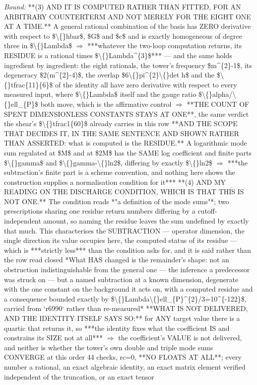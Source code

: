 \begin{description}
 \emph{Bound:}  **(3) AND IT IS COMPUTED RATHER THAN FITTED, FOR AN ARBITRARY COUNTERTERM AND NOT MERELY FOR THE EIGHT ONE AT A TIME.** A general rational combination of the basis has ZERO derivative with respect to \$\textbackslash\{\}hbar\$, \$G\$ and \$c\$ and is exactly homogeneous of degree three in \$\textbackslash\{\}Lambda\$ \ensuremath{\Rightarrow} ***whatever the two-loop computation returns, its RESIDUE is a rational times \$\textbackslash\{\}Lambda\textasciicircum{}\{3\}\$*** --- and the same holds ingredient by ingredient: the eight rationals, the tower's frequency \$m\textasciicircum{}\{2\}-1\$, its degeneracy \$2(m\textasciicircum{}\{2\}-4)\$, the overlap \$6\textbackslash\{\}pi\textasciicircum{}\{2\}\textbackslash\{\}det h\$ and the \$\textbackslash\{\}tfrac\{11\}\{6\}\$ of the identity all have zero derivative with respect to every measured input, where \$\textbackslash\{\}Lambda\$ itself and the gauge ratio \$\textbackslash\{\}alpha/\textbackslash\{\}ell\_\{P\}\$ both move, which is the affirmative control \ensuremath{\Rightarrow} **THE COUNT OF SPENT DIMENSIONLESS CONSTANTS STAYS AT ONE**, the same verdict the shear's \$\textbackslash\{\}tfrac1\{60\}\$ already carries in this row  **AND THE SCOPE THAT DECIDES IT, IN THE SAME SENTENCE AND SHOWN RATHER THAN ASSERTED: what is computed is the RESIDUE.** A logarithmic mode sum regulated at \$M\$ and at \$2M\$ has the SAME log coefficient and finite parts \$\textbackslash\{\}gamma\$ and \$\textbackslash\{\}gamma-\textbackslash\{\}ln2\$, differing by exactly \$\textbackslash\{\}ln2\$ \ensuremath{\Rightarrow} ***the subtraction's finite part is a scheme convention, and nothing here shows the construction supplies a normalisation condition for it***   **(4) AND MY READING ON THE DISCHARGE CONDITION, WHICH IS THAT THIS IS NOT ONE.** The condition reads *"a definition of the mode sums"*; two prescriptions sharing one residue return numbers differing by a cutoff-independent amount, so naming the residue leaves the sum undefined by exactly that much. This characterises the SUBTRACTION --- operator dimension, the single direction its value occupies here, the computed status of its residue --- which is ***strictly less*** than the condition asks for, and it is said rather than the row read closed   *What HAS changed is the remainder's shape: not an obstruction indistinguishable from the general one --- the inference a predecessor was struck on --- but a named subtraction at a known dimension, degenerate with the one constant on the background it acts on, with a computed residue and a consequence bounded exactly by \$\textbackslash\{\}Lambda\textbackslash\{\}ell\_\{P\}\textasciicircum{}\{2\}/3=10\textasciicircum{}\{-122\}\$, carried from `r6990` rather than re-measured*  **WHAT IS NOT DELIVERED, AND THE IDENTITY ITSELF SAYS SO:** for ANY target value there is a quartic that returns it, so ***the identity fixes what the coefficient IS and constrains its SIZE not at all*** \ensuremath{\Rightarrow} the coefficient's VALUE is not delivered, and neither is whether the tower's own double and triple mode sums CONVERGE at this order  44 checks, rc=0, **NO FLOATS AT ALL**; every number a rational, an exact algebraic identity, an exact matrix element verified independent of the truncation, or an exact tensor 
\end{description}
